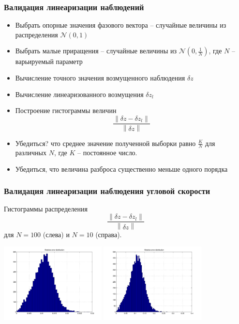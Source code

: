 \documentclass[utf8]{beamer}
\newcommand{\norm}[1]{\left\lVert#1\right\rVert}
\begin{document}
\begin{frame}
\frametitle{Валидация линеаризации наблюдений}
\begin{itemize}
    \item Выбрать опорные значения фазового вектора  -- случайные величины из
        распределения $\mathcal{N}\left(0, 1\right)$
    \item Выбрать малые приращения -- случайные величины из
        $\mathcal{N}\left(0, \frac{1}{N}\right)$, где $N$ -- варьируемый
        параметр
    \item Вычисление точного значения возмущенного наблюдения $\delta z$
    \item Вычисление линеаризованного возмущения $\delta z_{l}$
    \item Построение гистограммы величин
        $$
        \frac{\norm{\delta z - \delta z_l}}{\norm{\delta z}}
        $$
    \item Убедиться? что среднее значение полученной выборки равно
        $\frac{K}{N}$ для различных $N$, где $K$ -- постоянное число.
    \item Убедиться, что величина разброса существенно меньше одного порядка
\end{itemize}
\end{frame}
\begin{frame}
\frametitle{Валидация линеаризации наблюдения угловой скорости}
Гистограммы распределения 
$$
\frac{\norm{\delta z - \delta z_l}}{\norm{\delta z}}
$$
для $N = 100$ (слева) и $N=10$ (справа).
\begin{center}
\includegraphics[width=0.4\textwidth]{pic/lin_gyro_001.pdf}    
\includegraphics[width=0.4\textwidth]{pic/lin_gyro_01.pdf}    
\end{center}
\end{frame}
\end{document}
